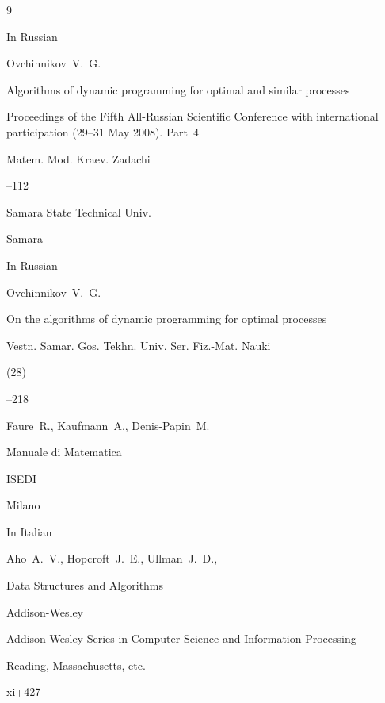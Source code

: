 \begin{thebibliography}{9}




\lang In Russian

\by Ovchinnikov~V.~G.

\paper Algorithms of dynamic programming for optimal and similar processes

\inbook Proceedings of the Fifth All-Russian Scientific Conference with international participation \rm (29--31 May 2008). Part~4

\serial Matem. Mod. Kraev. Zadachi


--112

\publ Samara State Technical Univ.

\publaddr Samara






\lang In Russian

\by Ovchinnikov~V.~G.

\paper On the algorithms of dynamic programming for optimal processes

\jour Vestn. Samar. Gos. Tekhn. Univ. Ser. Fiz.-Mat. Nauki


(28)

--218





\by Faure~R., Kaufmann~A., Denis-Papin~M.

\book Manuale di Matematica

\publ ISEDI

\publaddr Milano 


\lang In Italian




\by Aho~A.~V., Hopcroft~J.~E., Ullman~J.~D.,

\book  Data Structures and Algorithms

\publ Addison-Wesley


\serial Addison-Wesley Series in Computer Science and Information Processing

\publaddr Reading, Massachusetts, etc.

\totalpages xi+427 






\end{thebibliography}



\EngDate



\newpage

\Russian





%


